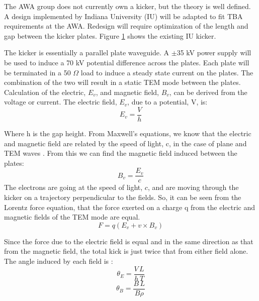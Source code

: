 \documentclass{iitthesis}
\begin{document}


The AWA group does not currently own a kicker, but the theory is well defined. 
A design implemented by Indiana University (IU) \cite{iukicker}
will be adapted to fit TBA requirements at the AWA. Redesign will require optimization
of the length and gap between the kicker plates. Figure \ref{fig:IUkicker} shows the existing IU kicker.
\begin{figure}[h]
	\begin{center}
		\label{fig:IUkicker}
	\end{center}
\end{figure}
The kicker is essentially a parallel plate waveguide. 
A $\pm$35 kV power supply will be used to induce a 70 kV potential difference 
across the plates. Each plate will be terminated in a 50 $\Omega$ load to induce a steady 
state current on the plates. The combination of the two will result in a static TEM mode 
between the plates. Calculation of the electric, $E_v$, and magnetic field, $B_v$,
can be derived from the voltage or current. The electric field, $E_v$, due to a potential, V, is: 
\begin{equation}
E_v=\frac{V}{h}
\end{equation}

Where h is the gap height. From Maxwell's equations, we know that the electric and magnetic 
field are related by the speed of light, c, in the case of plane and TEM waves \cite{pozar}. 
From this we can find the magnetic field induced between the plates: 
\begin{equation}
B_v=\frac{E_v}{c}
\end{equation}
The electrons are going at the speed of light, $c$, and are moving through the kicker on a 
trajectory perpendicular to the fields.  So, it can be seen from the Lorentz force equation, that the force 
exerted on a charge q from the electric and magnetic fields of the TEM mode are equal. 
\begin{equation}
F=q(E_v+v\times B_v)
\end{equation}

Since the force due to the electric field is equal and in the same direction as that from the magnetic field, 
the total kick is just twice that from either field alone.  The angle induced by each field is \cite{iukicker, Wiedemann}:  
\begin{equation}
\theta_E= \frac{V\,L}{h\,T}
\end{equation}
\begin{equation}
\theta_B= \frac{B\,L}{B\rho}
\end{equation}
\end{document}
